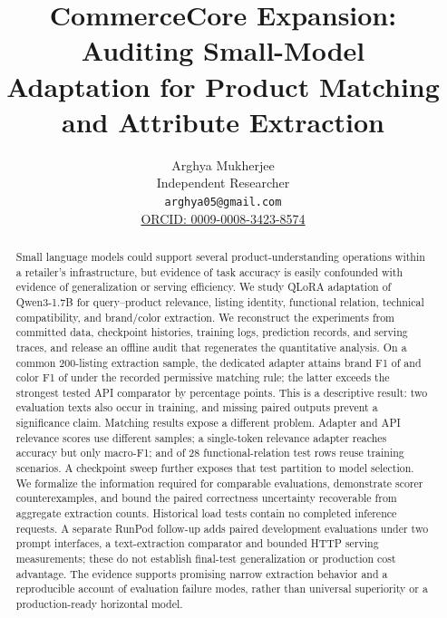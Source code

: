 \documentclass{article}
\title{CommerceCore Expansion: Auditing Small-Model\\Adaptation for Product Matching and Attribute Extraction}
\author{Arghya Mukherjee\\Independent Researcher\\\texttt{arghya05@gmail.com}\\\href{https://orcid.org/0009-0008-3423-8574}{ORCID: 0009-0008-3423-8574}}
\begin{document}
\raggedbottom
\maketitle
\begin{abstract}
Small language models could support several product-understanding operations within a retailer's infrastructure, but evidence of task accuracy is easily confounded with evidence of generalization or serving efficiency. We study QLoRA adaptation of Qwen3-1.7B for query--product relevance, listing identity, functional relation, technical compatibility, and brand/color extraction. We reconstruct the experiments from committed data, checkpoint histories, training logs, prediction records, and serving traces, and release an offline audit that regenerates the quantitative analysis. On a common 200-listing extraction sample, the dedicated adapter attains brand F1 of \ExtractionBrand{} and color F1 of \ExtractionColor{} under the recorded permissive matching rule; the latter exceeds the strongest tested API comparator by \ExtractionColorDelta{} percentage points. This is a descriptive result: two evaluation texts also occur in training, and missing paired outputs prevent a significance claim. Matching results expose a different problem. Adapter and API relevance scores use different samples; a single-token relevance adapter reaches \SingleAccuracy{} accuracy but only \SingleMacroF{} macro-F1; and \ScenarioTestSeen{} of 28 functional-relation test rows reuse training scenarios. A checkpoint sweep further exposes that test partition to model selection. We formalize the information required for comparable evaluations, demonstrate scorer counterexamples, and bound the paired correctness uncertainty recoverable from aggregate extraction counts. Historical load tests contain no completed inference requests. A separate RunPod follow-up adds paired development evaluations under two prompt interfaces, a text-extraction comparator and bounded HTTP serving measurements; these do not establish final-test generalization or production cost advantage. The evidence supports promising narrow extraction behavior and a reproducible account of evaluation failure modes, rather than universal superiority or a production-ready horizontal model.
\end{abstract}






\FloatBarrier

\clearpage
\appendix

\end{document}
